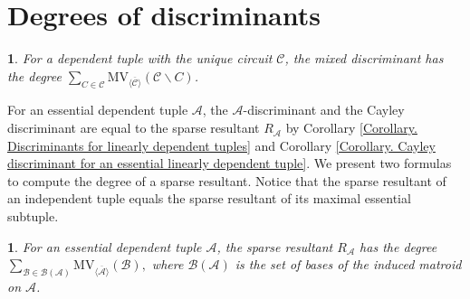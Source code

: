 \documentclass[11pt]{article}
\theoremstyle{plain}
\theoremstyle{definition}
\theoremstyle{remark}
\theoremstyle{plain}
\theoremstyle{plain}
\newtheorem{prop}[thm]{\protect\propositionname}
\theoremstyle{plain}
\newtheorem{cor}[thm]{\protect\corollaryname}
\theoremstyle{definition}
\providecommand{\corollaryname}{Corollary}
\providecommand{\propositionname}{Proposition}
\begin{document}
\section{\label{Section. Degrees of components}Degrees of discriminants}
\begin{cor}
\textup{\label{Corollary. Degree of the mixed discriminant for a linearly dependent tuple}\cite{pedersen_product_1993}
}For a dependent tuple with the unique circuit $\mathscr{C}$, the
mixed discriminant has the degree $\underset{C\in\mathscr{C}}{\sum}\mathrm{MV}_{\overline{\langle\mathscr{C}\rangle}}(\mathscr{C}\backslash C)$.
\end{cor}

For an essential dependent tuple $\mathscr{A}$, the $\mathscr{A}$-discriminant
and the Cayley discriminant are equal to the sparse resultant $R_{\mathscr{A}}$
by Corollary \ref{Corollary. Discriminants for linearly dependent tuples}
and Corollary \ref{Corollary. Cayley discriminant for an essential linearly dependent tuple}.
We present two formulas to compute the degree of a sparse resultant.
Notice that the sparse resultant of an independent tuple equals the
sparse resultant of its maximal essential subtuple.
\begin{prop}
\textup{\label{Proposition. I Degree of the sparse resultant for a linearly dependent tuple}}For
an essential dependent tuple $\mathscr{A}$, the sparse resultant
$R_{\mathscr{A}}$ has the degree $\underset{\mathscr{B}\in\mathcal{B}(\mathscr{A})}{\sum}\mathrm{MV}_{\overline{\langle\mathscr{A}\rangle}}(\mathscr{B}),$
where $\mathcal{B}(\mathscr{A})$ is the set of bases of the induced
matroid on $\mathscr{A}$.
\end{prop}
\end{document}
